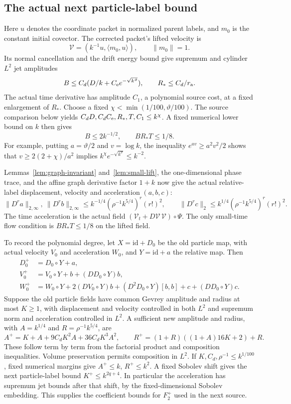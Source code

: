 \subsection{The actual next particle-label bound}

Here $u$ denotes the coordinate packet in normalized parent labels, and
$m_0$ is the constant initial covector. The corrected packet's lifted velocity is
\[
 \mathcal V=(k^{-1}u,\langle m_0,u\rangle),\qquad \|m_0\|=1.
\]
Its normal cancellation and the drift energy bound give supremum and
cylinder $L^2$ jet amplitudes
\[
 B\leq C_d(D/k+C_{\rm e}e^{-\sqrt{k^\vartheta}}),
 \qquad R_*\leq C_d/r_{\mathrm a}.
\]
The actual time derivative has amplitude $C_1$, a polynomial source
cost, at a fixed enlargement of $R_*$. Choose a fixed
$\chi<\min(1/100,\vartheta/100)$. The source comparison below yields
$C_dD,C_dC_{\rm e},R_*,T,C_1\leq k^\chi$. A fixed numerical lower
bound on $k$ then gives
\[
 B\leq2k^{-1/2},\qquad BR_*T\leq1/8.
\]
For example, putting $a=\vartheta/2$ and $v=\log k$, the inequality
$e^{av}\geq a^2v^2/2$ shows that
$v\geq2(2+\chi)/a^2$ implies
$k^\chi e^{-\sqrt{k^\vartheta}}\leq k^{-2}$.

Lemmas~\ref{lem:graph-invariant} and~\ref{lem:small-lift}, the
one-dimensional phase trace, and the affine graph derivative
factor $1+k$ now give the actual relative-label displacement,
velocity and acceleration $(a,b,c)$:
\[
 \|D^r a\|_{2,\infty},\ \|D^r b\|_{2,\infty}
 \leq k^{-1/4}(\rho^{-1}k^{5/4})^r(r!)^2,\qquad
 \|D^r c\|_2\leq k^{1/4}(\rho^{-1}k^{5/4})^r(r!)^2.
\]
The time acceleration is the actual field
$(\mathcal V_t+D\mathcal V\,\mathcal V)\circ\Psi$.
The only small-time flow condition is $BR_*T\leq1/8$ on the
lifted field.

To record the polynomial degree, let $X=\mathrm{id}+D_0$ be the
old particle map, with actual velocity $V_0$ and acceleration $W_0$,
and $Y=\mathrm{id}+a$ the relative map. Then
\[
 \begin{split}
 D_0^+&=D_0\circ Y+a,\\
 V_0^+&=V_0\circ Y+b+(DD_0\circ Y)b,\\
 W_0^+&=W_0\circ Y+2(DV_0\circ Y)b+
        (D^2D_0\circ Y)[b,b]+c+(DD_0\circ Y)c.
 \end{split}
\]
Suppose the old particle fields have common Gevrey amplitude and radius
at most $K\geq1$, with displacement and velocity controlled in both
$L^2$ and supremum norm and acceleration controlled in $L^2$.
A sufficient new amplitude
and radius, with $A=k^{1/4}$ and $R=\rho^{-1}k^{5/4}$, are
\[
 A^+=K+A+9C_dK^2A+36C_dK^3A^2,\qquad
 R^+=(1+R)((1+A)16K+2)+R .
\]
These follow term by term from the factorial product and composition
inequalities. Volume preservation permits composition in $L^2$.
If $K,C_d,\rho^{-1}\leq k^{1/100}$, fixed numerical margins give
$A^+\leq k$, $R^+\leq k^2$. A fixed Sobolev shift gives the next
particle-label bound $K^+\leq k^{2q+4}$. In particular the acceleration
has supremum jet bounds after that shift, by the fixed-dimensional
Sobolev embedding. This supplies the coefficient bounds for $F_2^+$
used in the next source.

